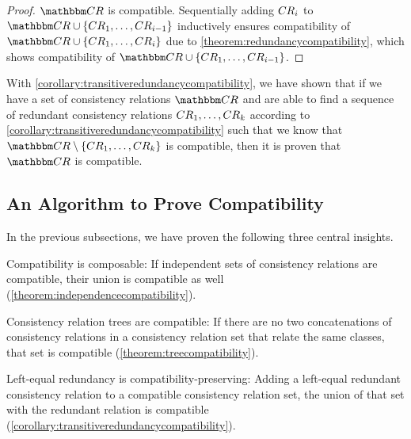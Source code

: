 \begin{proof}
    $\consistencyrelationset{CR}$ is compatible. Sequentially adding $\consistencyrelation{CR}{i}$ to $\consistencyrelationset{CR} \cup \setted{\consistencyrelation{CR}{1}, \dots, \consistencyrelation{CR}{i-1}}$ inductively ensures compatibility of $\consistencyrelationset{CR} \cup \setted{\consistencyrelation{CR}{1}, \dots, \consistencyrelation{CR}{i}}$ due to \autoref{theorem:redundancycompatibility}, which shows compatibility of $\consistencyrelationset{CR} \cup \setted{\consistencyrelation{CR}{1}, \dots, \consistencyrelation{CR}{i-1}}$.
\end{proof}

With \autoref{corollary:transitiveredundancycompatibility}, we have shown that if we have a set of consistency relations $\consistencyrelationset{CR}$ and are able to find a sequence of redundant consistency relations $\consistencyrelation{CR}{1}, \dots, {\consistencyrelation{CR}{k}}$ according to \autoref{corollary:transitiveredundancycompatibility} such that we know that $\consistencyrelationset{CR} \setminus \setted{ \consistencyrelation{CR}{1}, \dots, {\consistencyrelation{CR}{k}}}$ is compatible, then it is proven that $\consistencyrelationset{CR}$ is compatible.



\subsection{An Algorithm to Prove Compatibility} %
\label{chap:compatibility:formal_approach:algorithm}

In the previous subsections, we have proven the following three central insights.
\begin{longenumerate}
    \item Compatibility is composable: If independent sets of consistency relations are compatible, their union is compatible as well (\autoref{theorem:independencecompatibility}).
    \item Consistency relation trees are compatible: If there are no two concatenations of consistency relations in a consistency relation set that relate the same classes, that set is compatible (\autoref{theorem:treecompatibility}).
    \item Left-equal redundancy is compatibility-preserving: Adding a left-equal redundant consistency relation to a compatible consistency relation set, the union of that set with the redundant relation is compatible (\autoref{corollary:transitiveredundancycompatibility}).
\end{longenumerate}

